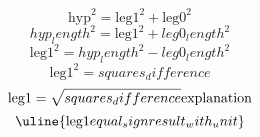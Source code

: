 \[\text{{{hyp}}}^{{2}}=\text{{{leg1}}}^{{2}}+\text{{{leg0}}}^{{2}}\]
\[{hyp_length}^{{2}}=\text{{{leg1}}}^{{2}}+{leg0_length}^{{2}}\]
\[\text{{{leg1}}}^{{2}}={hyp_length}^{{2}}-{leg0_length}^{{2}}\]
\[\text{{{leg1}}}^{{2}}={squares_difference}\]
\[\text{{{leg1}}}=\sqrt{{\mathstrut {squares_difference}}}\text{{{explanation}}}\]
\[\uline{{\text{{{leg1}}}{equal_sign}{result_with_unit}}}\]